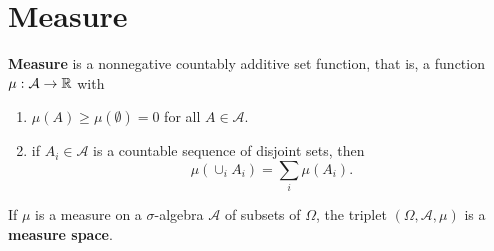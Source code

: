 \section{Measure}

\begin{definition}[Measure]
	\textbf{Measure} is a nonnegative countably additive set function, that is, a function $\mu:\mathcal{A}\rightarrow{\mathbb R}$ with
	\begin{enumerate}
		\item $\mu(A)\geq\mu(\emptyset)=0$ for all $A\in\mathcal{A}$.
		\item if $A_i\in\mathcal{A}$ is a countable sequence of disjoint sets, then $$\mu(\cup_iA_i)=\sum_i\mu(A_i).$$
	\end{enumerate}
\end{definition}





\begin{definition}
	If $\mu$ is a measure on a $\sigma$-algebra $\mathcal{A}$ of subsets of $\Omega$, the triplet $(\Omega,\mathcal{A},\mu)$ is a \textbf{measure space}.
\end{definition}


